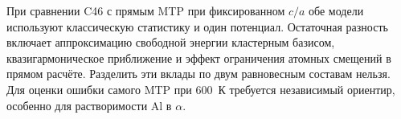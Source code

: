 При сравнении C46 с прямым MTP при фиксированном \(c/a\) обе модели
используют классическую статистику и один потенциал. Остаточная
разность включает аппроксимацию свободной энергии кластерным базисом,
квазигармоническое приближение и эффект ограничения атомных смещений
в прямом расчёте. Разделить эти вклады по двум равновесным составам
нельзя. Для оценки ошибки самого MTP при 600~К требуется независимый
ориентир, особенно для растворимости Al в \(\alpha\).
